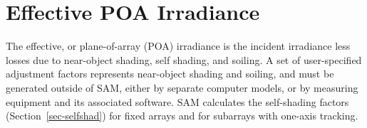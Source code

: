 \documentclass[12pt,letterpaper]{article}
\begin{document}
\chapter{Effective POA Irradiance}\label{sec-effectiveirradiance}

The effective, or plane-of-array (POA) irradiance is the incident irradiance less losses due to near-object shading, self shading, and soiling. A set of user-specified adjustment factors represents near-object shading and soiling, and must be generated outside of SAM, either by separate computer models, or by measuring equipment and its associated software. SAM calculates the self-shading factors (Section~\ref{sec-selfshad}) for fixed arrays and for subarrays with one-axis tracking.
\end{document}
